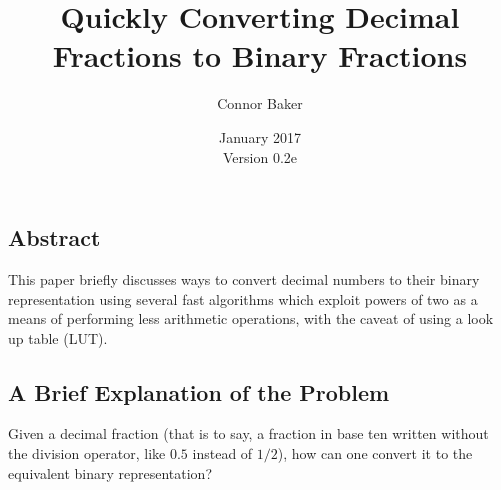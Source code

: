 \documentclass[12pt]{article}
\begin{document}

\null
\nointerlineskip
\vfill
\let \snewpage \newpage
\let \newpage \relax
\title{Quickly Converting Decimal Fractions to Binary Fractions}
\author{Connor Baker}
\date{January 2017\\Version 0.2e}
\maketitle

\begin{center}
  \subsection*{Abstract}
\end{center}
This paper briefly discusses ways to convert decimal numbers to their binary representation using several fast algorithms which exploit powers of two as a means of performing less arithmetic operations, with the caveat of using a look up table (LUT).

\let \newpage \snewpage
\vfill
\thispagestyle{empty}


\newpage %






\makeatletter
{}
\makeatother
\tableofcontents

\clearpage
{}



\newpage %



\begin{center}
\section{A Brief Explanation of the Problem}
\end{center}
Given a decimal fraction (that is to say, a fraction in base ten written without the division operator, like $0.5$ instead of $1/2$), how can one convert it to the equivalent binary representation?
\end{document}
